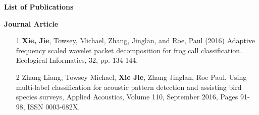 %





\newpage
\begin{center}
{\huge \textbf{List of Publications}}
\end{center}

{ \large \textbf{Journal Article}}
\begin{enumerate} 
\item[1]	\textbf{Xie, Jie}, Towsey, Michael, Zhang, Jinglan, and Roe, Paul (2016) Adaptive frequency scaled wavelet packet decomposition for frog call classification.  Ecological Informatics, 32, pp. 134-144.
\item[2]	Zhang Liang, Towsey Michael, \textbf{Xie Jie}, Zhang Jinglan, Roe Paul,  Using multi-label classification for acoustic pattern detection and assisting bird species surveys, Applied Acoustics, Volume 110, September 2016, Pages 91-98, ISSN 0003-682X,
\end{enumerate}

